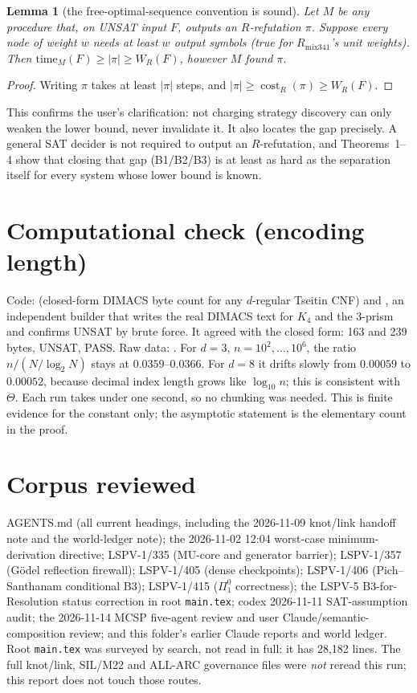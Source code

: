 \documentclass[11pt]{article}
\newtheorem{lemma}[theorem]{Lemma}
\theoremstyle{definition}
\begin{document}
\begin{lemma}[the free-optimal-sequence convention is sound]\label{lem:free}
Let $M$ be any procedure that, on UNSAT input $F$, \emph{outputs} an
$R$-refutation $\pi$. Suppose every node of weight $w$ needs at least $w$
output symbols (true for $R_{\mathrm{mix341}}$'s unit weights). Then
$\mathrm{time}_M(F)\ge|\pi|\ge W_R(F)$, however $M$ found $\pi$.
\end{lemma}
\begin{proof}
Writing $\pi$ takes at least $|\pi|$ steps, and $|\pi|\ge\operatorname{cost}_R(\pi)\ge W_R(F)$.
\end{proof}

\noindent This confirms the user's clarification: not charging strategy
discovery can only weaken the lower bound, never invalidate it. It also
locates the gap precisely. A general SAT decider is not required to output an
$R$-refutation, and Theorems~1--4 show that closing that gap (B1/B2/B3) is at
least as hard as the separation itself for every system whose lower bound is
known.

\section{Computational check (encoding length)}
Code:  (closed-form DIMACS
byte count for any $d$-regular Tseitin CNF) and
, an independent builder that
writes the real DIMACS text for $K_4$ and the 3-prism and confirms UNSAT by
brute force. It agreed with the closed form: 163 and 239 bytes, UNSAT, PASS.
Raw data: .
For $d=3$, $n=10^2,\dots,10^6$, the ratio $n/(N/\log_2N)$ stays at
$0.0359$--$0.0366$. For $d=8$ it drifts slowly from $0.00059$ to $0.00052$,
because decimal index length grows like $\log_{10}n$; this is consistent with
$\Theta$. Each run takes under one second, so no chunking was needed. This is
finite evidence for the constant only; the asymptotic statement is the
elementary count in the proof.

\section{Corpus reviewed}
AGENTS.md (all current headings, including the 2026-11-09 knot/link
handoff note and the world-ledger note); the 2026-11-02 12:04 worst-case
minimum-derivation directive; LSPV-1/335 (MU-core and generator barrier);
LSPV-1/357 (G\"odel reflection firewall); LSPV-1/405 (dense checkpoints);
LSPV-1/406 (Pich--Santhanam conditional B3); LSPV-1/415 ($\Pi^0_1$
correctness); the LSPV-5 B3-for-Resolution status correction in root
\texttt{main.tex}; codex 2026-11-11 SAT-assumption audit; the 2026-11-14
MCSP five-agent review and user Claude/semantic-composition review; and this
folder's earlier Claude reports and world ledger. Root \texttt{main.tex} was
surveyed by search, not read in full: it has 28{,}182 lines. The full
knot/link, SIL/M22 and ALL-ARC governance files were \emph{not} reread this
run; this report does not touch those routes.
\end{document}
